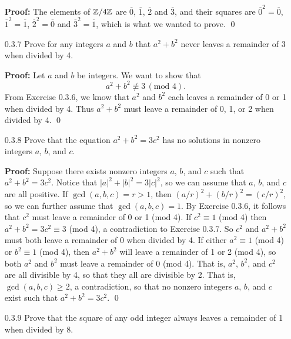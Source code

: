 \begin{enumerate}
      \textbf{Proof:} The elements of $\mathbb{Z}/4\mathbb{Z}$ are $\overline{0}$,
      $\overline{1}$, $\overline{2}$ and $\overline{3}$, and their squares are
      $\overline{0}^2 = \overline{0}$, $\overline{1}^2 = \overline{1}$,
      $\overline{2}^2 = \overline{0}$ and $\overline{3}^2 = \overline{1}$, which
      is what we wanted to prove. \qed
   \item[0.3.7]   Prove for any integers $a$ and $b$ that $a^2 + b^2$ never
                  leaves a remainder of 3 when divided by 4.
                  
      \textbf{Proof:} Let $a$ and $b$ be integers. We want to show that
      $$a^2 + b^2 \not\equiv 3 \,(\text{mod }4).$$
      From Exercise 0.3.6, we know that $a^2$ and $b^2$ each leaves a remainder
      of 0 or 1 when divided by 4. Thus $a^2 + b^2$ must leave a remainder of
      0, 1, or 2 when divided by 4. \qed
   \item[0.3.8]   Prove that the equation $a^2 + b^2 = 3c^2$ has no solutions in
                  nonzero integers $a$, $b$, and $c$.
                  
      \textbf{Proof:} Suppose there exists nonzero integers $a$, $b$, and $c$
      such that $a^2 + b^2 = 3c^2$. Notice that $|a|^2 + |b|^2 = 3|c|^2$, so we
      can assume that $a$, $b$, and $c$ are all positive. If
      $\gcd(a, b, c) = r > 1$, then $(a/r)^2 + (b/r)^2 = (c/r)^2$, so we can
      further assume that $\gcd(a, b, c) = 1$. By Exercise 0.3.6, it follows
      that $c^2$ must leave a remainder of 0 or 1 (mod 4). If $c^2 \equiv 1$
      (mod 4) then $a^2 + b^2 = 3c^2 \equiv 3$ (mod 4), a contradiction to
      Exercise 0.3.7. So $c^2$ and $a^2 + b^2$ must both leave a remainder of
      0 when divided by 4. If either $a^2 \equiv 1$ (mod 4) or $b^2 \equiv 1$
      (mod 4), then $a^2 + b^2$ will leave a remainder of 1 or 2 (mod 4), so
      both $a^2$ and $b^2$ must leave a remainder of 0 (mod 4). That is,
      $a^2$, $b^2$, and $c^2$ are all divisible by 4, so that they all are
      divisible by 2. That is, $\gcd(a, b, c) \ge 2$, a contradiction, so that
      no nonzero integers $a$, $b$, and $c$ exist such that
      $a^2 + b^2 = 3c^2$. \qed
   \item[0.3.9]   Prove that the square of any odd integer always leaves a
                  remainder of 1 when divided by 8.
                  

\end{enumerate}
